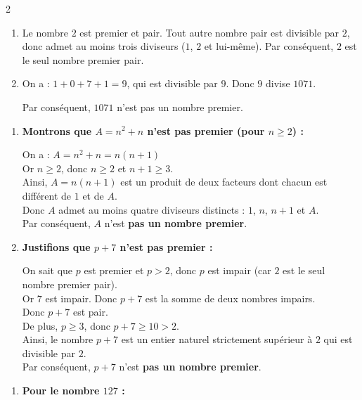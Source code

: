 \documentclass[10pt, a4paper]{article}
\begin{document}
\begin{multicols*}{2}
\begin{Solution}[ACTIVITÉ][2]
\begin{enumerate}[leftmargin=*,itemsep=0.5pt]
    \item Le nombre $2$ est premier et pair. Tout autre nombre pair est divisible par $2$, donc admet au moins trois diviseurs ($1$, $2$ et lui-même). Par conséquent, $2$ est le seul nombre premier pair.

    \item On a : $1 + 0 + 7 + 1 = 9$, qui est divisible par $9$. Donc $9$ divise $1071$.

Par conséquent, $1071$ n'est pas un nombre premier.
\end{enumerate}

\end{Solution}

\begin{Solution}[APPLICATION][7]
\begin{enumerate}[leftmargin=*,itemsep=0.5pt]
    \item \textbf{Montrons que $A = n^2 + n$ n'est pas premier (pour $n \geq 2$) :}

    On a : $A = n^2 + n = n(n + 1)$ \\
    Or $n \geq 2$, donc $n \geq 2$ et $n + 1 \geq 3$. \\
    Ainsi, $A = n(n+1)$ est un produit de deux facteurs dont chacun est différent de $1$ et de $A$. \\
    Donc $A$ admet au moins quatre diviseurs distincts : $1$, $n$, $n+1$ et $A$. \\
    Par conséquent, $A$ n'est \textbf{pas un nombre premier}.

    \item \textbf{Justifions que $p + 7$ n'est pas premier :}

    On sait que $p$ est premier et $p > 2$, donc $p$ est impair (car $2$ est le seul nombre premier pair). \\
    Or $7$ est impair. Donc $p + 7$ est la somme de deux nombres impairs. \\
    Donc $p + 7$ est pair. \\
    De plus, $p \geq 3$, donc $p + 7 \geq 10 > 2$. \\
    Ainsi, le nombre $p + 7$ est un entier naturel strictement supérieur à $2$ qui est divisible par $2$. \\
    Par conséquent, $p + 7$ n'est \textbf{pas un nombre premier}.
\end{enumerate}
\end{Solution}

\begin{Solution}[APPLICATION][8]
\begin{enumerate}[leftmargin=*,itemsep=0.5pt]
    \item \textbf{Pour le nombre $127$ :}


\end{enumerate}
\end{Solution}
\end{multicols*}
\end{document}
